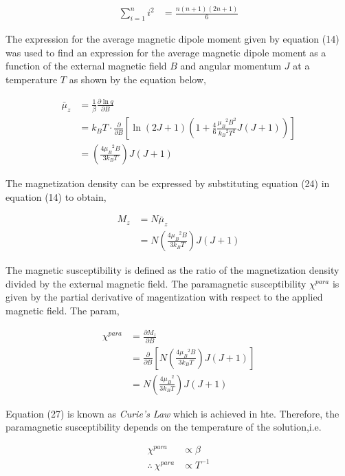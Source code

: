 \documentclass[a4paper,11pt]{article}
\begin{document}
\begin{align}
\sum_{i=1}^{n} i^2	& = \frac{n(n+1)(2n+1)}{6}
\end{align}

The expression for the average magnetic dipole moment given by equation (14) was used to find an expression for the average magnetic dipole moment as a function of the external magnetic field $B$ and angular momentum $J$ at a temperature $T$ as shown by the equation below,

\begin{align}
\bar{\mu}_z	& = \frac{1}{\beta} \frac{\partial \ln{q}}{\partial B}\nonumber\\
			& = k_B T \cdot \frac{\partial}{\partial B}\left[ \ln{(2J+1) \left(1 + \frac{4}{6}\frac{{\mu_B}^2 B^2}{{k_B}^2 T^2}						J(J+1) \right)}\right]\nonumber\\
			& = \left( \frac{4 {\mu_B}^2 B}{3 k_B T} \right) J(J+1)
\end{align}

The magnetization density can be expressed by substituting equation (24) in equation (14) to obtain,

\begin{align}
M_z	& = N \bar{\mu}_z\nonumber\\
	& = N \left( \frac{4 {\mu_B}^2 B}{3 k_B T} \right) J(J+1)
\end{align} 

The magnetic susceptibility is defined as the ratio of the magnetization density divided by the external magnetic field\cite{blundell2003}. The paramagnetic susceptibility $\chi^{\textit{para}}$ is given by the partial derivative of magentization with respect to the applied magnetic field. The param,

\begin{align}
\chi^{\textit{para}}	& = \frac{\partial M_z}{\partial B}\\
						& = \frac{\partial}{\partial B} \left[ N \left( \frac{4 {\mu_B}^2 B}{3 k_B T} \right) J(J+1) \right]\nonumber\\
						& = N \left( \frac{4 {\mu_B}^2}{3 k_B T} \right) J(J+1)\nonumber
\end{align}    

Equation (27) is known as \textit{Curie's Law} which is achieved in hte\cite{coey2010}. Therefore, the paramagnetic susceptibility depends on the temperature of the solution,i.e.

\begin{align}
\chi^{\textit{para}}	& \propto \beta\nonumber\\
\therefore~\chi^{\textit{para}}	& \propto T^{-1} 
\end{align}  
\end{document}
